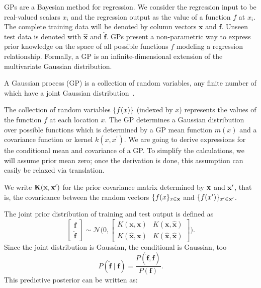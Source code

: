 \ac{GP}s are a Bayesian method for regression. We consider the regression input to be real-valued scalars $x_i$ and the regression output as the value of a function $f$ at $x_i$. The complete training data will be denoted by column vectors $\mathbf{x}$ and $\mathbf{f}$. Unseen test data is denoted with $\mathbf{\hat{x}}$ and $\mathbf{\hat{f}}$.
\ac{GP}s present a non-parametric way to express prior knowledge on the space of all possible functions $f$ modeling
a regression relationship.
Formally, a GP is an infinite-dimensional extension of the multivariate Gaussian distribution.
\begin{definition}
A Gaussian process (GP) is a collection of random variables, any
finite number of which have a joint Gaussian distribution~\citep[][chapter 2]{rasmussen2006gaussian}.
\end{definition}
The collection of random variables $\left\{ f(x) \right\}$ (indexed by $x$) represents the
values of the function $f$ at each location $x$.
The \ac{GP} determines a Gaussian distribution over possible functions 
which is determined by a \ac{GP} mean function $m(x)$ and a covariance function or kernel $k(x,x^\prime)$.
We are going to derive expressions for the conditional mean and covariance of a
GP.  To simplify the calculations, we will assume prior mean zero; once the
derivation is done, this assumption can easily be relaxed via translation.

We write $\mathbf{K}(\mathbf{x},\mathbf{x}^\prime)$ for the prior covariance matrix determined by $\mathbf{x}$ and $\mathbf{x}^\prime$, that
is, the covaricance between the random vectors $\{f(x\}_{x \in \mathbf{x}}$ and $\{f(x')\}_{x' \in
\mathbf{x}'}$.
 


The joint prior distribution of training and test output is defined as 
\begin{equation}
\begin{bmatrix}
\mathbf{f} \\ 
\mathbf{\hat{f}}
\end{bmatrix}
\sim \mathcal{N}\bigg(
0,
\begin{bmatrix}
K(\mathbf{x},\mathbf{x})& K(\mathbf{x},\mathbf{\hat{x}})\\ 
K(\mathbf{\hat{x}},\mathbf{x})& K(\mathbf{\hat{x}},\mathbf{\hat{x}})
\end{bmatrix}
\bigg).
\end{equation}
Since the joint distribution is Gaussian, the conditional is Gaussian, too
\begin{equation}
\label{eq:simple_posterior}
P(\hat{\mathbf{f}} \mid \mathbf{f})  = \frac{P(\hat{\mathbf{f}}, \mathbf{f}) }{P(\mathbf{f})}.
\end{equation}
This predictive posterior can be written as:

